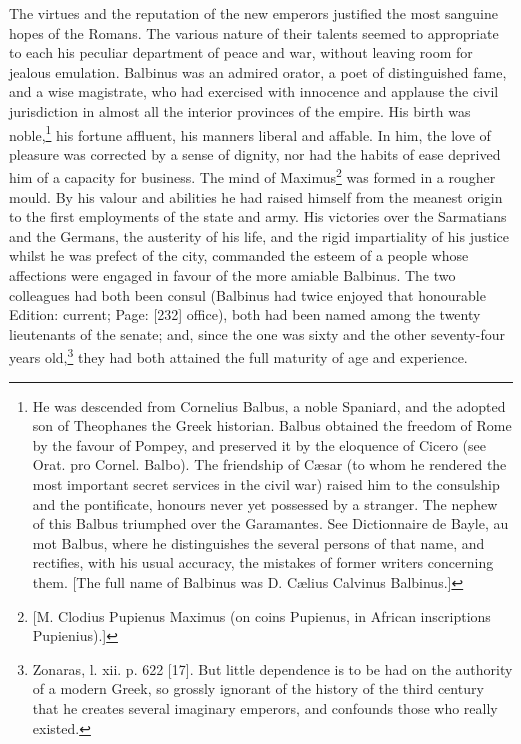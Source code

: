 The virtues and the reputation of the new emperors justified the most sanguine hopes of the Romans. The various nature of their talents seemed to appropriate to each his peculiar department of peace and war, without leaving room for jealous emulation. Balbinus was an admired orator, a poet of distinguished fame, and a wise magistrate, who had exercised with innocence and applause the civil jurisdiction in almost all the interior provinces of the empire. His birth was noble,\footnote{He was descended from Cornelius Balbus, a noble Spaniard, and the adopted son of Theophanes the Greek historian. Balbus obtained the freedom of Rome by the favour of Pompey, and preserved it by the eloquence of Cicero (see Orat. pro Cornel. Balbo). The friendship of Cæsar (to whom he rendered the most important secret services in the civil war) raised him to the consulship and the pontificate, honours never yet possessed by a stranger. The nephew of this Balbus triumphed over the Garamantes. See Dictionnaire de Bayle, au mot Balbus, where he distinguishes the several persons of that name, and rectifies, with his usual accuracy, the mistakes of former writers concerning them. [The full name of Balbinus was D. Cælius Calvinus Balbinus.]} his fortune affluent, his manners liberal and affable. In him, the love of pleasure was corrected by a sense of dignity, nor had the habits of ease deprived him of a capacity for business. The mind of Maximus\footnote{[M. Clodius Pupienus Maximus (on coins Pupienus, in African inscriptions Pupienius).]} was formed in a rougher mould. By his valour and abilities he had raised himself from the meanest origin to the first employments of the state and army. His victories over the Sarmatians and the Germans, the austerity of his life, and the rigid impartiality of his justice whilst he was prefect of the city, commanded the esteem of a people whose affections were engaged in favour of the more amiable Balbinus. The two colleagues had both been consul (Balbinus had twice enjoyed that honourable Edition: current; Page: [232] office), both had been named among the twenty lieutenants of the senate; and, since the one was sixty and the other seventy-four years old,\footnote{Zonaras, l. xii. p. 622 [17]. But little dependence is to be had on the authority of a modern Greek, so grossly ignorant of the history of the third century that he creates several imaginary emperors, and confounds those who really existed.} they had both attained the full maturity of age and experience.

